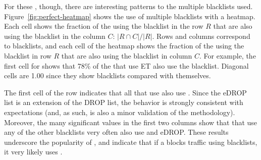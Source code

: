 For these {}, though, there are interesting patterns to the
multiple blacklists used.  Figure~\ref{fig:perfect-heatmap} shows the
use of multiple blacklists with a heatmap.  Each cell shows the fraction of the {} using the blacklist in the
   row $R$ that are also using the blacklist in the column $C$: $|R \cap C| / |R|$. Rows and columns
correspond to blacklists, and each cell of the heatmap shows the
fraction of the {} using the blacklist in row $R$ that are
also using the blacklist in column $C$.  For example, the first cell
for {\etcompromised} shows that 78\% of the {} that use ET
also use the {\spamhausdrop} blacklist.  Diagonal cells are 1.00 since
they show blacklists compared with themselves.

The first cell of the {\spamhausedrop} row indicates that all
{} that use {\spamhausedrop} also use {\spamhausdrop}.
Since the eDROP list is an extension of the DROP list, the behavior is
strongly consistent with expectations (and, as such, is also a minor
validation of the methodology).  Moreover, the many significant values
in the first two columns show that {} that use any of the
other blacklists very often also use {\spamhausdrop} and eDROP.  These
results underscore the popularity of {\spamhausdrop}, and indicate
that if a {} blocks traffic using blacklists, it very likely
uses {\spamhausdrop}.




